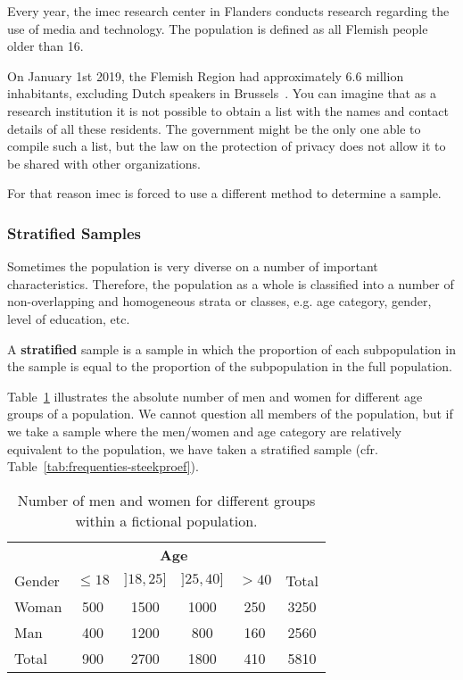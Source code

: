 \begin{example}
    Every year, the imec research center in Flanders conducts research regarding the use of media and technology. The population is defined as all Flemish people older than 16. 
    
    On January 1st 2019, the Flemish Region had approximately 6.6 million inhabitants, excluding Dutch speakers in Brussels~\autocite{Statbel2019}. You can imagine that as a research institution it is not possible to obtain a list with the names and contact details of all these residents. The government might be the only one able to compile such a list, but the law on the protection of privacy does not allow it to be shared with other organizations.
    
    For that reason imec is forced to use a different method to determine a sample.
\end{example}

\subsubsection{Stratified Samples}

Sometimes the population is very diverse on a number of important characteristics. Therefore, the population as a whole is classified into a number of non-overlapping and homogeneous strata or classes, e.g. age category, gender, level of education, etc.

\begin{definition}
    A \textbf{stratified} sample is a sample in which the proportion of each subpopulation in the sample is equal to the proportion of the subpopulation in the full population.
\end{definition}

\begin{example}
    Table~\ref{tab:frequenties-populatie} illustrates the absolute number of men and women for different age groups of a population.
    We cannot question all members of the population, but if we take a sample where the men/women and age category are relatively equivalent to the population, we have taken a stratified sample (cfr. Table~\ref{tab:frequenties-steekproef}).
\end{example}

\begin{table}
    \centering
    \begin{tabular}{l|cccc|c}
        & \multicolumn{4}{c|}{\textbf{Age}} & \\
        Gender & $\le 18$ & $]18,25]$ & $]25, 40]$ & $> 40$ & Total\\
        \hline
        Woman & 500 & 1500 & 1000 & 250 & 3250 \\
        Man   & 400 & 1200 & 800 & 160 & 2560\\
        \hline
        Total & 900 & 2700 & 1800 & 410 & 5810
    \end{tabular}
    \caption{Number of men and women for different groups within a fictional population.}
    \label{tab:frequenties-populatie}
\end{table}

